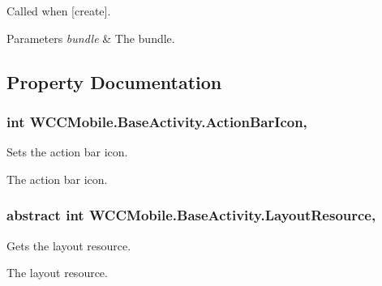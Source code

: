 Called when \mbox{[}create\mbox{]}. 


\begin{DoxyParams}{Parameters}
{\em bundle} & The bundle.\\
\hline
\end{DoxyParams}


\subsection{Property Documentation}
\subsubsection[{\texorpdfstring{Action\+Bar\+Icon}{ActionBarIcon}}]{\setlength{\rightskip}{0pt plus 5cm}int W\+C\+C\+Mobile.\+Base\+Activity.\+Action\+Bar\+Icon\hspace{0.3cm}{\ttfamily [set]}, {\ttfamily [protected]}}\hypertarget{class_w_c_c_mobile_1_1_base_activity_a3774a3ded238f234fdc92089a16636fa}{}\label{class_w_c_c_mobile_1_1_base_activity_a3774a3ded238f234fdc92089a16636fa}


Sets the action bar icon. 

The action bar icon. 
\subsubsection[{\texorpdfstring{Layout\+Resource}{LayoutResource}}]{\setlength{\rightskip}{0pt plus 5cm}abstract int W\+C\+C\+Mobile.\+Base\+Activity.\+Layout\+Resource\hspace{0.3cm}{\ttfamily [get]}, {\ttfamily [protected]}}\hypertarget{class_w_c_c_mobile_1_1_base_activity_a982e69396d64fad1bbf643c2874c0cbd}{}\label{class_w_c_c_mobile_1_1_base_activity_a982e69396d64fad1bbf643c2874c0cbd}


Gets the layout resource. 

The layout resource. 
